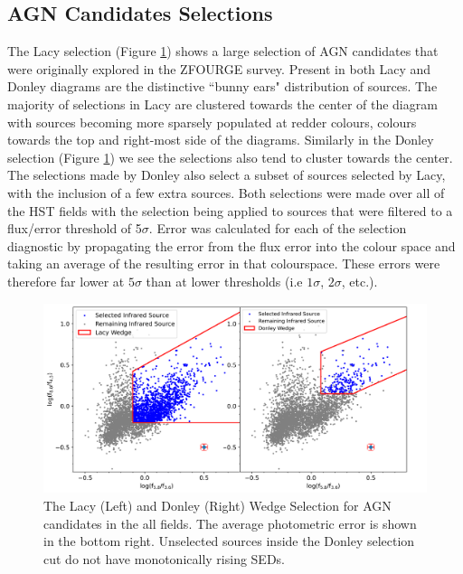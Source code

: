 \documentclass[11pt]{iopart}
\begin{document}
\subsection{AGN Candidates Selections}
The Lacy selection (Figure \ref{fig:DonleyLacyWedge}) shows a large selection of AGN candidates that were originally explored in the ZFOURGE survey. Present in both Lacy and Donley diagrams are the distinctive ``bunny ears" distribution of sources\cite{sajina_simulating_2005}. The majority of selections in Lacy are clustered towards the center of the diagram with sources becoming more sparsely populated at redder colours, colours towards the top and right-most side of the diagrams. Similarly in the Donley selection (Figure \ref{fig:DonleyLacyWedge}) we see the selections also tend to cluster towards the center. The selections made by Donley also select a subset of sources selected by Lacy, with the inclusion of a few extra sources. Both selections were made over all of the HST fields with the selection being applied to sources that were filtered to a flux/error threshold of 5$\sigma$. Error was calculated for each of the selection diagnostic by propagating the error from the flux error into the colour space and taking an average of the resulting error in that colourspace. These errors were therefore far lower at $5\sigma$ than at lower thresholds (i.e $1\sigma$, $2\sigma$, etc.). 
\begin{figure}
  \centering
  \includegraphics[width=1\linewidth]{plots/All_fieldsDonleyLacyWedge_error.png}
  \caption{The Lacy (Left) and Donley (Right) Wedge Selection for AGN candidates in the all fields. The average photometric error is shown in the bottom right. Unselected sources inside the Donley selection cut do not have monotonically rising SEDs.}
  \label{fig:DonleyLacyWedge}
\end{figure}
\end{document}
